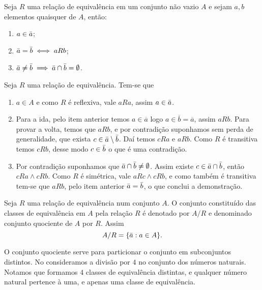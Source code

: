 \documentclass[../main.tex]{subfiles}
\begin{document}
\begin{teo}\label{agb-teo-relacaoEquivalenciaPropriedades}
    Seja $R$ uma relação de equivalência em um conjunto não vazio $A$ e sejam $a,b$ elementos quaisquer de $A$, então:
    \begin{enumerate}[label=(\roman*)]
        \item $a \in \Bar{a}$;
        \item $\Bar{a} = \Bar{b} \iff aRb$;
        \item $\Bar{a} \neq \Bar{b} \implies \Bar{a} \cap \Bar{b} = \emptyset $.
    \end{enumerate}
\end{teo}

\begin{dem}
    Seja $R$ uma relação de equivalência. Tem-se que
    \begin{enumerate}[label=(\roman*)]
        \item $a \in A$ e como $R$ é reflexiva, vale $aRa$, assim $a \in \Bar{a}$.
        \item Para a ida, pelo item anterior temos $a \in \overline{a}$ logo $a \in \overline{b} = \overline{a}$, assim $aRb$. Para provar a volta, temos que $aRb$, e por contradição suponhamos sem perda de generalidade, que exista $c \in \Bar{a} \setminus \Bar{b}$. Daí temos $cRa$ e $aRb$. Como $R$ é transitiva temos $cRb$, desse modo $c \in \Bar{b}$ o que é uma contradição.
        \item Por contradição suponhamos que $\Bar{a} \cap \Bar{b} \neq \emptyset$. Assim existe $c \in \Bar{a} \cap \Bar{b}$, então $cRa \land cRb$. Como  $R$ é simétrica, vale $aRc \land cRb$, e como também é transitiva tem-se que $aRb$, pelo item anterior $\Bar{a} = \Bar{b}$, o que conclui a demonstração.
    \end{enumerate}
\end{dem}

\begin{defi}\label{agb-def-conjuntoQuociente}
    Seja $R$ uma relação de equivalência num conjunto $A$. O conjunto constituído das classes de equivalência em $A$ pela relação $R$ é denotado por $A / R$ e denominado conjunto quociente de $A$ por $R$. Assim
    \[ A / R = \{\Bar{a} : a \in A\}. \]
    
\end{defi}
O conjunto quociente serve para particionar o conjunto em subconjuntos distintos. No  consideramos a divisão por $4$ no conjunto dos números naturais. Notamos que formamos $4$ classes de equivalência distintas, e qualquer número natural pertence à uma, e apenas uma classe de equivalência.
\end{document}
